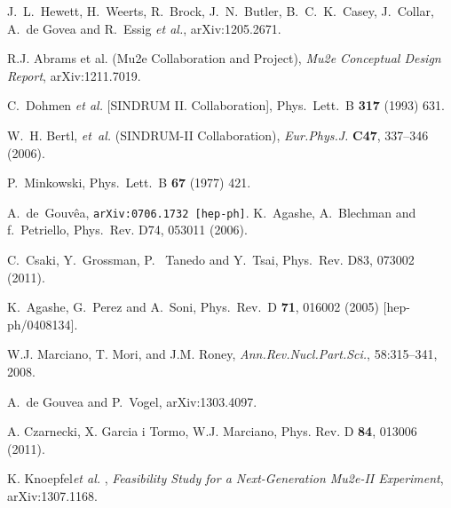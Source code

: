 \begin{thebibliography}{99}

% 
% 
  J.~L.~Hewett, H.~Weerts, R.~Brock, J.~N.~Butler, B.~C.~K.~Casey, J.~Collar, A.~de Govea and R.~Essig {\it et al.},
  arXiv:1205.2671.

 R.J. Abrams et al. (Mu2e Collaboration and Project), 
  {\it{Mu2e Conceptual Design Report}}, arXiv:1211.7019.
  
  C.~Dohmen {\it et al.}  [SINDRUM II. Collaboration],
  Phys.\ Lett.\ B {\bf 317} (1993) 631.

W.~H. Bertl, {\it et~al.} (SINDRUM-II Collaboration), \emph{Eur.Phys.J.} \textbf{C47}, 337--346 (2006).

  P.~Minkowski,
  Phys.\ Lett.\ B {\bf 67} (1977) 421.
  
A.~de~Gouv{\^e}a, \texttt{arXiv:0706.1732 [hep-ph]}.
K.~Agashe, A.~Blechman and f.~Petriello,
Phys.~Rev. D74, 053011 (2006).

C.~Csaki, Y.~Grossman, P.~ Tanedo and Y.~Tsai,
Phys.~Rev. D83, 073002 (2011).

  K.~Agashe, G.~Perez and A.~Soni,
  Phys.\ Rev.\ D {\bf 71}, 016002 (2005)
  [hep-ph/0408134].

W.J. Marciano, T. Mori, and J.M. Roney,
\emph{Ann.Rev.Nucl.Part.Sci.}, 58:315--341, 2008.

  A.~de Gouvea and P.~Vogel,
  arXiv:1303.4097.

 A. Czarnecki, X. Garcia i Tormo, W.J. Marciano, 
  Phys. Rev. D {\bf 84}, 013006 (2011).


 K. Knoepfel{\it  et al.} , 
  {\it{Feasibility Study for a Next-Generation Mu2e-II Experiment}}, arXiv:1307.1168.


\end{thebibliography}
